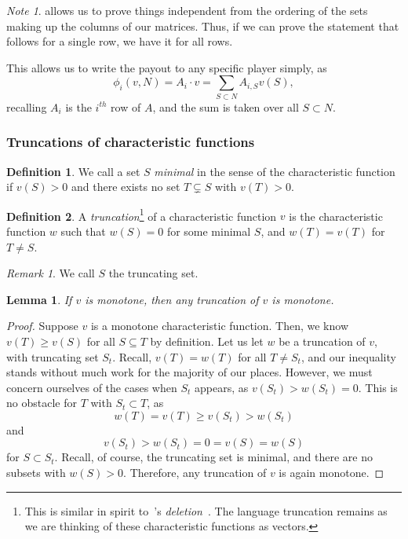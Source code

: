 \documentclass[12pt,letterpaper,final]{article}
\theoremstyle{plain}
\theoremstyle{plain}
\theoremstyle{plain}
\newtheorem{lemma}[theorem]{Lemma}
\theoremstyle{plain}
\theoremstyle{plain}
\theoremstyle{plain}
\theoremstyle{plain}
\theoremstyle{definition}
\newtheorem{definition}{Definition}[section]
\theoremstyle{definition}
\theoremstyle{definition}
\theoremstyle{definition}
\theoremstyle{definition}
\theoremstyle{remark}
\newtheorem*{remark}{Remark}
\theoremstyle{remark}
\newtheorem*{note}{Note}
\theoremstyle{remark}
\theoremstyle{remark}
\begin{document}
\begin{note}
   allows us to prove things
  independent from the ordering of the sets making up the columns of
  our matrices. Thus, if we can prove the statement that follows for a
  single row, we have it for all rows.
\end{note}

This allows us to write the payout to any specific player simply, as
\[
  \phi_i(v,N) = A_i\cdot v = \sum_{S\subset N} A_{i,S}v(S),
\]
recalling \(A_i\) is the \(i^{th}\) row of \(A\), and the sum is taken
over all \(S\subset N\).  

\subsubsection{Truncations of characteristic functions}

\begin{definition}
  We call a set \(S\) \emph{minimal} in the sense of the characteristic
  function if
  \(v(S)>0\) and there exists no set \(T \subsetneq S\) with
  \(v(T)>0\).
\end{definition}

\begin{definition}
  A \emph{truncation}\footnote{This is similar in spirit to~\citeauthor{Weber78}'s
    \emph{deletion}~\cite[Section 6]{Weber78}. The language truncation
    remains as we are thinking of these characteristic functions as
    vectors.} of a characteristic
  function \(v\) is the characteristic function \(w\) such that
  \(w(S) = 0\) for some minimal \(S\), and \(w(T) = v(T)\) for \(T\neq S\).
\end{definition}

\begin{remark}
  We call \(S\) the truncating set. 
\end{remark}

\begin{lemma}
  If \(v\) is monotone, then any truncation of \(v\) is monotone.
\end{lemma}

\begin{proof}
  Suppose \(v\) is a monotone characteristic function. Then, we know
  \(v(T) \geq v(S)\) for all \(S\subseteq T\) by definition. Let us
  let \(w\) be a truncation of \(v\), with truncating set
  \(S_t\). Recall, \(v(T) = w(T)\) for all \(T\neq S_t\), 
  and our inequality stands without much work for the majority
  of our places. However, we must concern ourselves of the cases when
  \(S_t\) appears, as \(v(S_t) > w(S_t) = 0\). This is no obstacle for
  \(T\) with \(S_t \subset T\), as
  \[
    w(T) = v(T) \geq v(S_t) > w(S_t)
  \]
  and
  \[
    v(S_t) > w(S_t)=0= v(S) = w(S)
  \]
  for \(S\subset S_t\). 
  Recall, of course, the truncating set is minimal, and there are no
  subsets with \(w(S)>0\). 
  Therefore, any truncation of \(v\) is again monotone.
\end{proof}
\end{document}
